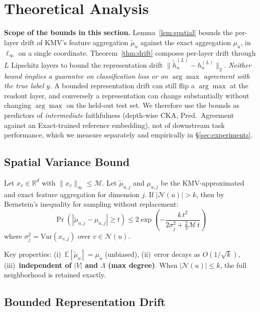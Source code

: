 \documentclass[sigconf]{acmart}
\begin{document}
\section{Theoretical Analysis}
\label{sec:theory}

\textbf{Scope of the bounds in this section.}
Lemma~\ref{lem:spatial} bounds the per-layer drift of KMV's feature aggregation $\tilde{\mu}_u$ against the exact aggregation $\mu_u$, in $\ell_\infty$ on a single coordinate. Theorem~\ref{thm:drift} composes per-layer drift through $L$ Lipschitz layers to bound the representation drift $\|\tilde{h}_u^{(L)} - h_u^{(L)}\|_2$. \emph{Neither bound implies a guarantee on classification loss or on $\arg\max$ agreement with the true label $y$.} A bounded representation drift can still flip a $\arg\max$ at the readout layer, and conversely a representation can change substantially without changing $\arg\max$ on the held-out test set. We therefore use the bounds as predictors of \emph{intermediate} faithfulness (depth-wise CKA, Pred.\ Agreement against an Exact-trained reference embedding), not of downstream task performance, which we measure separately and empirically in \S\ref{sec:experiments}.

\subsection{Spatial Variance Bound}

\begin{lemma}
\label{lem:spatial}
Let $x_v \in \mathbb{R}^d$ with $\|x_v\|_\infty \leq \mathcal{M}$.
Let $\tilde{\mu}_{u,j}$ and $\mu_{u,j}$ be the KMV-approximated and exact feature aggregation for dimension $j$.
If $|\mathcal{N}(u)| > k$, then by Bernstein's inequality for sampling without replacement:
\[
  \Pr\!\left(|\tilde{\mu}_{u,j} - \mu_{u,j}| \geq t\right)
  \leq 2 \exp\!\left(- \frac{k\,t^2}{2\sigma_j^2 + \tfrac{2}{3}\mathcal{M}\,t}\right)
\]
where $\sigma_j^2 = \mathrm{Var}(x_{v,j})$ over $v \in \mathcal{N}(u)$.
\end{lemma}

Key properties: (i)~$\mathbb{E}[\tilde{\mu}_u] = \mu_u$ (unbiased), (ii)~error decays as $O(1/\sqrt{k})$, (iii)~\textbf{independent of $|V|$ and $\Lambda$ (max degree)}.
When $|\mathcal{N}(u)| \leq k$, the full neighborhood is retained exactly.

\subsection{Bounded Representation Drift}
\end{document}
